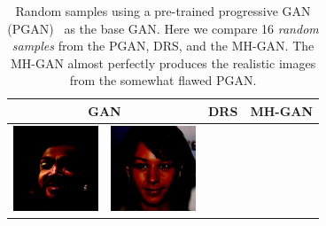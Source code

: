 \documentclass{article}
\newcommand{\pganw}{1.0in}
\begin{document}
\begin{table}[htbp]
\begin{center}
  \caption{{\small
    Random samples using a pre-trained progressive GAN (PGAN)~\citep{} as the base GAN\@.
    Here we compare 16 \emph{random samples} from the PGAN, DRS, and the MH-GAN\@.
    The MH-GAN almost perfectly produces the realistic images from the somewhat flawed PGAN\@.
    }}
  \label{tbl:pgan}
\setlength\tabcolsep{2pt} %
\begin{tabular}{cc|cc|cc}
\multicolumn{2}{c|}{GAN} & \multicolumn{2}{c|}{DRS} & \multicolumn{2}{c}{MH-GAN} \\
\toprule
\includegraphics[width=\pganw]{figures/pgan/0_base_raw_base.png} &
\includegraphics[width=\pganw]{figures/pgan/1_base_raw_base.png} &

\end{tabular}
\end{center}
\end{table}
\end{document}
